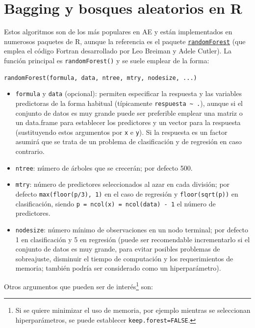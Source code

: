 \documentclass[
  spanish,
]{book}
\theoremstyle{break}
\theoremstyle{definition}
\theoremstyle{definition}
\theoremstyle{definition}
\theoremstyle{definition}
\theoremstyle{remark}
\begin{document}
\hypertarget{bagging-rf-r}{%
\section{Bagging y bosques aleatorios en R}\label{bagging-rf-r}}

Estos algoritmos son de los más populares en AE y están implementados en numerosos paquetes de R, aunque la referencia es el paquete \href{https://CRAN.R-project.org/package=randomForest}{\texttt{randomForest}} (que emplea el código Fortran desarrollado por Leo Breiman y Adele Cutler).
La función principal es \texttt{randomForest()} y se suele emplear de la forma:

\texttt{randomForest(formula,\ data,\ ntree,\ mtry,\ nodesize,\ ...)}

\begin{itemize}
\item
  \texttt{formula} y \texttt{data} (opcional): permiten especificar la respuesta y las variables predictoras de la forma habitual (típicamente \texttt{respuesta\ \textasciitilde{}\ .}), aunque si el conjunto de datos es muy grande puede ser preferible emplear una matriz o un data.frame para establecer los predictores y un vector para la respuesta (sustituyendo estos argumentos por \texttt{x} e \texttt{y}).
  Si la respuesta es un factor asumirá que se trata de un problema de clasificación y de regresión en caso contrario.
\item
  \texttt{ntree}: número de árboles que se crecerán; por defecto 500.
\item
  \texttt{mtry}: número de predictores seleccionados al azar en cada división; por defecto \texttt{max(floor(p/3),\ 1)} en el caso de regresión y \texttt{floor(sqrt(p))} en clasificación, siendo \texttt{p\ =\ ncol(x)\ =\ ncol(data)\ -\ 1} el número de predictores.
\item
  \texttt{nodesize}: número mínimo de observaciones en un nodo terminal; por defecto 1 en clasificación y 5 en regresión (puede ser recomendable incrementarlo si el conjunto de datos es muy grande, para evitar posibles problemas de sobreajuste, disminuir el tiempo de computación y los requerimientos de memoria; también podría ser considerado como un hiperparámetro).
\end{itemize}

Otros argumentos que pueden ser de interés\footnote{Si se quiere minimizar el uso de memoria, por ejemplo mientras se seleccionan hiperparámetros, se puede establecer \texttt{keep.forest=FALSE}.} son:
\end{document}
